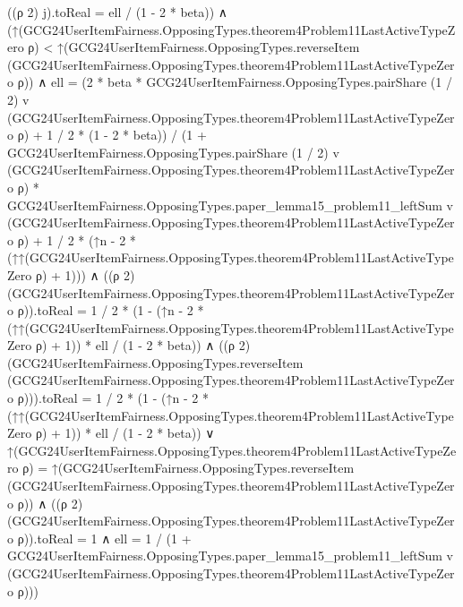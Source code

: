 \documentclass[10pt]{article}
\begin{document}
\begin{ReviewVerbatim}
                  ((ρ 2) j).toReal = ell / (1 - 2 * beta)) ∧
            (↑(GCG24UserItemFairness.OpposingTypes.theorem4Problem11LastActiveTypeZero ρ) <
                  ↑(GCG24UserItemFairness.OpposingTypes.reverseItem
                      (GCG24UserItemFairness.OpposingTypes.theorem4Problem11LastActiveTypeZero ρ)) ∧
                ell =
                    (2 * beta *
                          GCG24UserItemFairness.OpposingTypes.pairShare (1 / 2) v
                            (GCG24UserItemFairness.OpposingTypes.theorem4Problem11LastActiveTypeZero ρ) +
                        1 / 2 * (1 - 2 * beta)) /
                      (1 +
                          GCG24UserItemFairness.OpposingTypes.pairShare (1 / 2) v
                              (GCG24UserItemFairness.OpposingTypes.theorem4Problem11LastActiveTypeZero ρ) *
                            GCG24UserItemFairness.OpposingTypes.paper_lemma15_problem11_leftSum v
                              (GCG24UserItemFairness.OpposingTypes.theorem4Problem11LastActiveTypeZero ρ) +
                        1 / 2 *
                          (↑n -
                            2 * (↑↑(GCG24UserItemFairness.OpposingTypes.theorem4Problem11LastActiveTypeZero ρ) + 1))) ∧
                  ((ρ 2) (GCG24UserItemFairness.OpposingTypes.theorem4Problem11LastActiveTypeZero ρ)).toReal =
                      1 / 2 *
                        (1 -
                          (↑n -
                                2 *
                                  (↑↑(GCG24UserItemFairness.OpposingTypes.theorem4Problem11LastActiveTypeZero ρ) + 1)) *
                              ell /
                            (1 - 2 * beta)) ∧
                    ((ρ 2)
                          (GCG24UserItemFairness.OpposingTypes.reverseItem
                            (GCG24UserItemFairness.OpposingTypes.theorem4Problem11LastActiveTypeZero ρ))).toReal =
                      1 / 2 *
                        (1 -
                          (↑n -
                                2 *
                                  (↑↑(GCG24UserItemFairness.OpposingTypes.theorem4Problem11LastActiveTypeZero ρ) + 1)) *
                              ell /
                            (1 - 2 * beta)) ∨
              ↑(GCG24UserItemFairness.OpposingTypes.theorem4Problem11LastActiveTypeZero ρ) =
                  ↑(GCG24UserItemFairness.OpposingTypes.reverseItem
                      (GCG24UserItemFairness.OpposingTypes.theorem4Problem11LastActiveTypeZero ρ)) ∧
                ((ρ 2) (GCG24UserItemFairness.OpposingTypes.theorem4Problem11LastActiveTypeZero ρ)).toReal = 1 ∧
                  ell =
                    1 /
                      (1 +
                        GCG24UserItemFairness.OpposingTypes.paper_lemma15_problem11_leftSum v
                          (GCG24UserItemFairness.OpposingTypes.theorem4Problem11LastActiveTypeZero ρ)))
\end{ReviewVerbatim}
\end{document}
